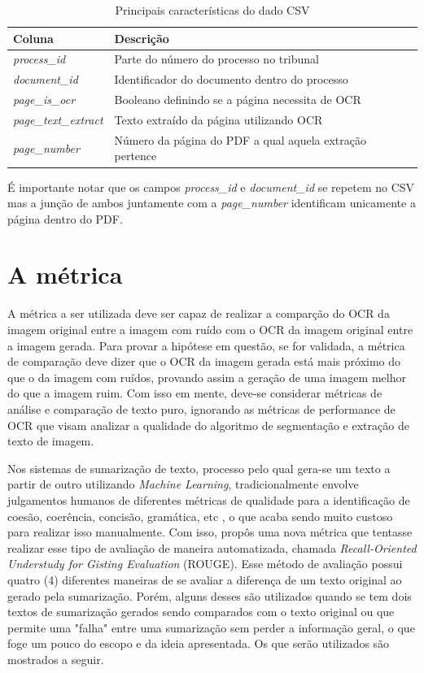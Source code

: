 \begin{table}[h]
 \centering
 \caption{Principais características do dado CSV}
 \begin{tabular}{|m{9em}|m{20em}|}
    \hline
      \textbf{Coluna}  &
      \textbf{Descrição} \\
    \hline
      \textit{process\_id}  &
      Parte do número do processo no tribunal \\
    \hline
      \textit{document\_id}  &
      Identificador do documento dentro do processo \\
    \hline
      \textit{page\_is\_ocr}  &
      Booleano definindo se a página necessita de OCR \\
    \hline
      \textit{page\_text\_extract} &
      Texto extraído da página utilizando OCR \\
    \hline
      \textit{page\_number} &
      Número da página do PDF a qual aquela extração pertence \\
    \hline
 \end{tabular}
 \label{tab:csv-details}
\end{table}

É importante notar que os campos \textit{process\_id} e \textit{document\_id} se repetem no CSV mas a junção de ambos juntamente com a \textit{page\_number} identificam unicamente a página dentro do PDF.

\section{A métrica}

A métrica a ser utilizada deve ser capaz de realizar a comparção do OCR da imagem original entre a imagem com ruído com o OCR da imagem original entre a imagem gerada. Para provar a hipótese em questão, se for validada, a métrica de comparação deve dizer que o OCR da imagem gerada está mais próximo do que o da imagem com ruídos, provando assim a geração de uma imagem melhor do que a imagem ruim. Com isso em mente, deve-se considerar métricas de análise e comparação de texto puro, ignorando as métricas de performance de OCR que visam analizar a qualidade do algoritmo de segmentação e extração de texto de imagem.

Nos sistemas de sumarização de texto, processo pelo qual gera-se um texto a partir de outro utilizando \textit{Machine Learning}, tradicionalmente envolve julgamentos humanos de diferentes métricas de qualidade para a identificação de coesão, coerência, concisão, gramática, etc \cite{automatic-summarization}, o que acaba sendo muito custoso para realizar isso manualmente. Com isso,  propôs uma nova métrica que tentasse realizar esse tipo de avaliação de maneira automatizada, chamada \textit{Recall-Oriented Understudy for Gisting Evaluation} (ROUGE). Esse método de avaliação possui quatro (4) diferentes maneiras de se avaliar a diferença de um texto original ao gerado pela sumarização. Porém, alguns desses são utilizados quando se tem dois textos de sumarização gerados sendo comparados com o texto original ou que permite uma "falha" entre uma sumarização sem perder a informação geral, o que foge um pouco do escopo e da ideia apresentada. Os que serão utilizados são mostrados a seguir.

